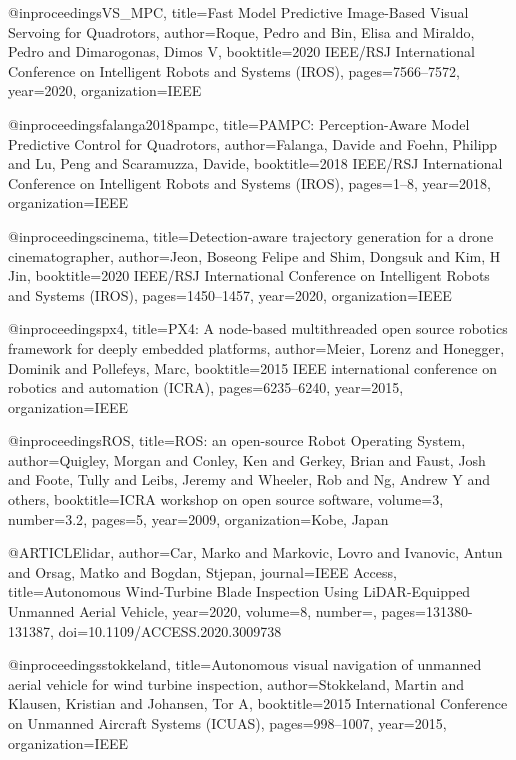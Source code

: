\begin{thebibliography}{9}
@inproceedings{VS_MPC,
  title={Fast Model Predictive Image-Based Visual Servoing for Quadrotors},
  author={Roque, Pedro and Bin, Elisa and Miraldo, Pedro and Dimarogonas, Dimos V},
  booktitle={2020 IEEE/RSJ International Conference on Intelligent Robots and Systems (IROS)},
  pages={7566--7572},
  year={2020},
  organization={IEEE}
}


@inproceedings{falanga2018pampc,
  title={PAMPC: Perception-Aware Model Predictive Control for Quadrotors},
  author={Falanga, Davide and Foehn, Philipp and Lu, Peng and Scaramuzza, Davide},
  booktitle={2018 IEEE/RSJ International Conference on Intelligent Robots and Systems (IROS)},
  pages={1--8},
  year={2018},
  organization={IEEE}
}

@inproceedings{cinema,
  title={Detection-aware trajectory generation for a drone cinematographer},
  author={Jeon, Boseong Felipe and Shim, Dongsuk and Kim, H Jin},
  booktitle={2020 IEEE/RSJ International Conference on Intelligent Robots and Systems (IROS)},
  pages={1450--1457},
  year={2020},
  organization={IEEE}
}





@inproceedings{px4,
  title={PX4: A node-based multithreaded open source robotics framework for deeply embedded platforms},
  author={Meier, Lorenz and Honegger, Dominik and Pollefeys, Marc},
  booktitle={2015 IEEE international conference on robotics and automation (ICRA)},
  pages={6235--6240},
  year={2015},
  organization={IEEE}
}

@inproceedings{ROS,
  title={ROS: an open-source Robot Operating System},
  author={Quigley, Morgan and Conley, Ken and Gerkey, Brian and Faust, Josh and Foote, Tully and Leibs, Jeremy and Wheeler, Rob and Ng, Andrew Y and others},
  booktitle={ICRA workshop on open source software},
  volume={3},
  number={3.2},
  pages={5},
  year={2009},
  organization={Kobe, Japan}
}

@ARTICLE{lidar,  author={Car, Marko and Markovic, Lovro and Ivanovic, Antun and Orsag, Matko and Bogdan, Stjepan},  journal={IEEE Access},   title={Autonomous Wind-Turbine Blade Inspection Using LiDAR-Equipped Unmanned Aerial Vehicle},   year={2020},  volume={8},  number={},  pages={131380-131387},  doi={10.1109/ACCESS.2020.3009738}}



@inproceedings{stokkeland,
  title={Autonomous visual navigation of unmanned aerial vehicle for wind turbine inspection},
  author={Stokkeland, Martin and Klausen, Kristian and Johansen, Tor A},
  booktitle={2015 International Conference on Unmanned Aircraft Systems (ICUAS)},
  pages={998--1007},
  year={2015},
  organization={IEEE}
}



\end{thebibliography}
